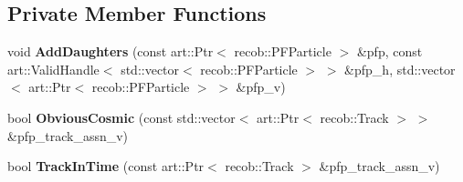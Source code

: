 \subsection*{Private Member Functions}
\begin{DoxyCompactItemize}
\item 
void {\bfseries Add\+Daughters} (const art\+::\+Ptr$<$ recob\+::\+P\+F\+Particle $>$ \&pfp, const art\+::\+Valid\+Handle$<$ std\+::vector$<$ recob\+::\+P\+F\+Particle $>$ $>$ \&pfp\+\_\+h, std\+::vector$<$ art\+::\+Ptr$<$ recob\+::\+P\+F\+Particle $>$ $>$ \&pfp\+\_\+v)\hypertarget{classCosmicRejection_a3d08aca297afc5331fdbab328b356137}{}\label{classCosmicRejection_a3d08aca297afc5331fdbab328b356137}

\item 
bool {\bfseries Obvious\+Cosmic} (const std\+::vector$<$ art\+::\+Ptr$<$ recob\+::\+Track $>$ $>$ \&pfp\+\_\+track\+\_\+assn\+\_\+v)\hypertarget{classCosmicRejection_afc2a715c5cf89aa6c20faebe5b5f7119}{}\label{classCosmicRejection_afc2a715c5cf89aa6c20faebe5b5f7119}

\item 
bool {\bfseries Track\+In\+Time} (const art\+::\+Ptr$<$ recob\+::\+Track $>$ \&pfp\+\_\+track\+\_\+assn\+\_\+v)\hypertarget{classCosmicRejection_a1538163eeb6a0ed22f6bba844952f1f0}{}\label{classCosmicRejection_a1538163eeb6a0ed22f6bba844952f1f0}

\end{DoxyCompactItemize}
